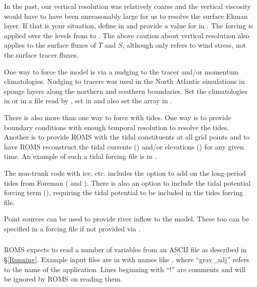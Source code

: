 In the past, our vertical resolution was relatively coarse and the
vertical viscosity would have to have been unreasonably large for
us to resolve the surface Ekman layer.  If that is your situation,
define  in  and provide a value for
 in .  The forcing is applied over the
levels from  to .  The above caution about
vertical resolution also applies to the surface fluxes of $T$ and
$S$, although  only refers to wind stress, not the
surface tracer fluxes.

\smallskip
{}

One way to force the model is via a nudging to the tracer and/or
momentum climatologies. Nudging to tracers was used in the North
Atlantic simulations in sponge layers along the northern and southern
boundaries. Set the climatologies in  or in a
file read by , set  in
 and also set the array  in
.

\smallskip
{}

There is also more than one way to force with tides. One way is to
provide boundary conditions with enough temporal resolution to
resolve the tides. Another is to provide ROMS with the tidal
constituents at all grid points and to have ROMS reconstruct the
tidal currents ()  and/or elevations ()
for any given time. An example of such a tidal forcing file is in
.

The non-trunk code with ice, etc. includes the  option to
add on the long-period tides from Foreman
(\cite{Foreman_96a} and \cite{Foreman_96b}). There is also an option to include the tidal potential
forcing term (), requiring the tidal potential to
be included in the tides forcing file.

\smallskip
{}

Point sources can be used to provide river inflow to the model.
These too can be specified in a forcing file if not provided via
.

\subsubsection{}
\label{ASCII_in}
ROMS expects to read a number of variables from an ASCII file as described
in \S\ref{Running}.
Example input files are in  with names like
, where ``grav\_adj'' refers to the name of
the application. Lines beginning with ``!'' are comments and will be
ignored by ROMS on reading them.

